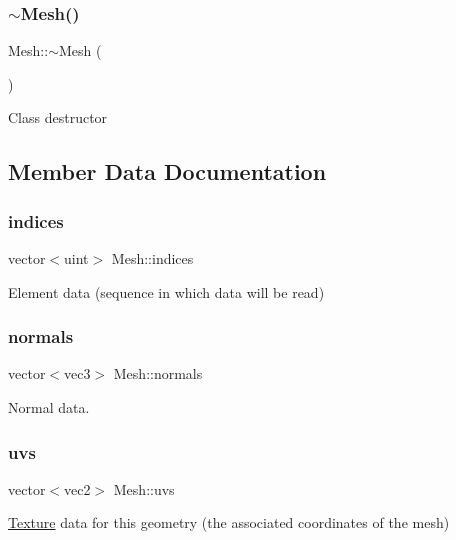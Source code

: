 \subsubsection{\texorpdfstring{$\sim$\+Mesh()}{~Mesh()}}
{\footnotesize\ttfamily Mesh\+::$\sim$\+Mesh (\begin{DoxyParamCaption}{ }\end{DoxyParamCaption})}

Class destructor 

\subsection{Member Data Documentation}
\mbox{\label{structMesh_a1bf53bf594529c21e428a0f8d93976bf}} 
\subsubsection{\texorpdfstring{indices}{indices}}
{\footnotesize\ttfamily vector$<$uint$>$ Mesh\+::indices}



Element data (sequence in which data will be read) 

\mbox{\label{structMesh_a7f23733d1225e7c875f21b74699d0220}} 
\subsubsection{\texorpdfstring{normals}{normals}}
{\footnotesize\ttfamily vector$<$vec3$>$ Mesh\+::normals}



Normal data. 

\mbox{\label{structMesh_a3819d7dd33b2b3d32f20bbaafe063fd0}} 
\subsubsection{\texorpdfstring{uvs}{uvs}}
{\footnotesize\ttfamily vector$<$vec2$>$ Mesh\+::uvs}

\mbox{\hyperlink{classTexture}{Texture}} data for this geometry (the associated coordinates of the mesh) \mbox{\label{structMesh_adcb6c07f7b25f91163901b6ac08aefe6}} 
